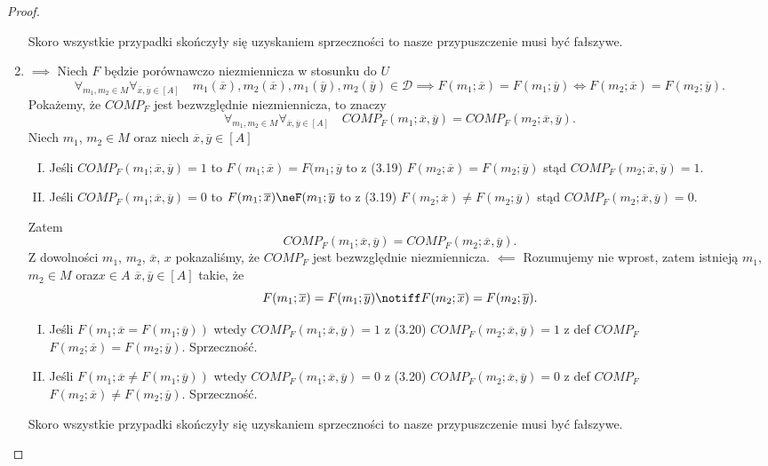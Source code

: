 \documentclass[12pt,a4paper]{report}
\newcommand{\domkniecie}[1]{\left\lbrack{#1}\right\rbrack}
\begin{document}
\begin{proof}
\begin{enumerate}
\begin{enumerate}[I.]
\end{enumerate}
Skoro wszystkie przypadki skończyły się uzyskaniem sprzeczności to nasze przypuszczenie musi być fałszywe.
\item 
$\implies$
Niech $F$ będzie porównawczo niezmiennicza w stosunku do $U$ 
\begin{equation}
\forall_{m_1, m_2 \in M}  \forall_{\overline{x},\overline{y} \in \domkniecie{A}} \quad m_1(\overline{x}), m_2(\overline{x}),m_1(\overline{y}), m_2(\overline{y}) \in \mathcal{D} \implies  F(m_{1};\overline{x})=F(m_{1};\overline{y}) \iff F(m_{2};\overline{x})=F(m_{2};\overline{y}).
\end{equation}
Pokażemy, że $COMP_{F}$ jest bezwzględnie niezmiennicza, to znaczy
\begin{equation}
\forall_{m_1, m_2 \in M} \forall_{\overline{x}, \overline{y}\in \domkniecie{A}} \quad COMP_{F}(m_1;\overline{x},\overline{y})=COMP_{F}(m_2;\overline{x},\overline{y}).
\end{equation}
 Niech $m_1$, $m_2 \in M$ oraz niech $\overline{x}, \overline{y} \in \domkniecie{A}$ 
\begin{enumerate}[I.]
\item
Jeśli $COMP_{F}(m_1;\overline{x},\overline{y})=1$ to $F(m_1;\overline{x})=F(m_1;\overline{y}$ to z (3.19) $F(m_2;\overline{x})=F(m_2;\overline{y})$ stąd $COMP_{F}(m_2;\overline{x},\overline{y})=1$.
\item
Jeśli $COMP_{F}(m_1;\overline{x},\overline{y})=0$ to $F(m_1;\overline{x})\neF(m_1;\overline{y}$ to z (3.19) $F(m_2;\overline{x})\ne F(m_2;\overline{y})$ stąd $COMP_{F}(m_2;\overline{x},\overline{y})=0$.
\end{enumerate}
Zatem 
$$
COMP_{F}(m_1;\overline{x},\overline{y})=COMP_{F}(m_2;\overline{x},\overline{y}).
$$
Z dowolności $m_1$, $m_2$, $\overline{x}$, $x$ pokazaliśmy, że $COMP_{F}$ jest bezwzględnie niezmiennicza.
$\impliedby$
Rozumujemy nie wprost, zatem istnieją $m_1$, $m_2 \in M$ oraz$x\in A$ $\overline{x}, \overline{y} \in \domkniecie{A}$ takie, że
$$
F(m_{1};\overline{x})=F(m_{1};\overline{y}) \notiff F(m_{2};\overline{x})=F(m_{2};\overline{y}).
$$
\begin{enumerate}[I.]
\item
Jeśli $F(m_1;\overline{x}=F(m_1;\overline{y}))$ wtedy $COMP_{F}(m_1;\overline{x},\overline{y})=1$ z (3.20) $COMP_{F}(m_2;\overline{x},\overline{y})=1$ z def $COMP_F$ $F(m_2;\overline{x})=F(m_2;\overline{y})$. Sprzeczność.
\item
Jeśli $F(m_1;\overline{x}\ne F(m_1;\overline{y}))$ wtedy $COMP_{F}(m_1;\overline{x},\overline{y})=0$ z (3.20) $COMP_{F}(m_2;\overline{x},\overline{y})=0$ z def $COMP_F$ $F(m_2;\overline{x})\ne F(m_2;\overline{y})$. Sprzeczność.
\end{enumerate}
Skoro wszystkie przypadki skończyły się uzyskaniem sprzeczności to nasze przypuszczenie musi być fałszywe.
\end{enumerate}
\end{proof}
\end{document}
